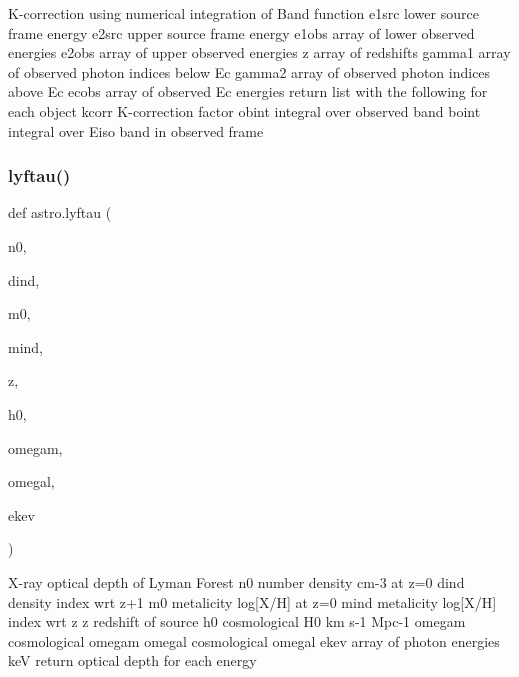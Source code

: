 \begin{DoxyVerb}K-correction using numerical integration of Band function
    e1src  lower source frame energy
    e2src  upper source frame energy
    e1obs  array of lower observed energies
    e2obs  array of upper observed energies
    z      array of redshifts
    gamma1 array of observed photon indices below Ec
    gamma2 array of observed photon indices above Ec
    ecobs  array of observed Ec energies
return list with the following for each object
    kcorr  K-correction factor 
    obint  integral over observed band
    boint  integral over Eiso band in observed frame
\end{DoxyVerb}
 \mbox{\label{namespaceastro_a356be8e8b6fafe3b3af92710b9a328cf}} 
\subsubsection{\texorpdfstring{lyftau()}{lyftau()}}
{\footnotesize\ttfamily def astro.\+lyftau (\begin{DoxyParamCaption}\item[{}]{n0,  }\item[{}]{dind,  }\item[{}]{m0,  }\item[{}]{mind,  }\item[{}]{z,  }\item[{}]{h0,  }\item[{}]{omegam,  }\item[{}]{omegal,  }\item[{}]{ekev }\end{DoxyParamCaption})}

\begin{DoxyVerb}X-ray optical depth of Lyman Forest
    n0     number density cm-3 at z=0
    dind   density index wrt z+1
    m0     metalicity log[X/H] at z=0
    mind   metalicity log[X/H] index wrt z
    z      redshift of source
    h0     cosmological H0 km s-1 Mpc-1
    omegam cosmological omegam
    omegal cosmological omegal
    ekev   array of photon energies keV
return optical depth for each energy
\end{DoxyVerb}
 \mbox{\label{namespaceastro_a4273aff2ae289e312c7c1dd4ece3b019}} 
